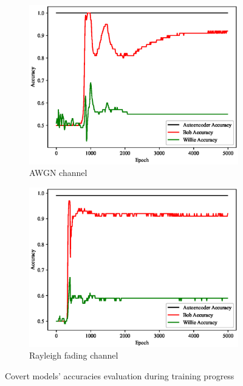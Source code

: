 \begin{figure}[tp!]
	\center
	\begin{subfigure}{0.24\textwidth}
		\includegraphics[width=\linewidth]{figs/training_progress_awgn}
		\caption{AWGN channel}
	\end{subfigure}
	\hfill
	\begin{subfigure}{0.24\textwidth}
		\includegraphics[width=\linewidth]{figs/training_progress_rayleigh}
		\caption{Rayleigh fading channel}	
	\end{subfigure}
	\caption{Covert models' accuracies evaluation during training progress}
	\label{fig:traning_progress}
\end{figure}
